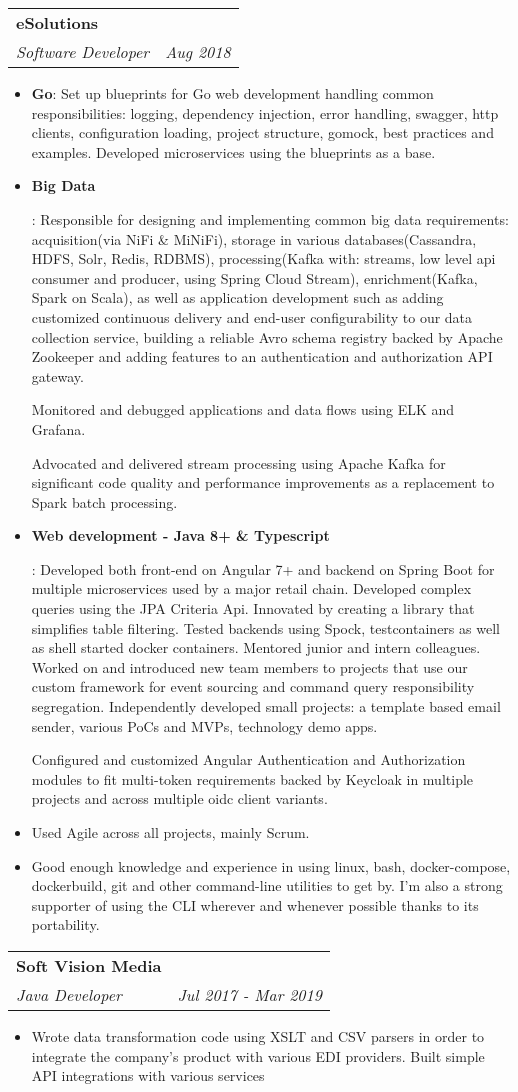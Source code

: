 \documentclass[letterpaper,11pt]{article}
\makeatletter
\newcommand{\resumeItem}[2]{
  \item\small{
    \textbf{#1}{: #2 \vspace{-2pt}}
  }
}
\newcommand{\simpleResumeItem}[1]{
  \item\small{
  #1
  }
}
\newcommand{\resumeSubheading}[4]{
  \vspace{-1pt}\item
    \begin{tabular*}{0.97\textwidth}[t]{l@{\extracolsep{\fill}}r}
      \textbf{#1} & #2 \\
      \textit{\small#3} & \textit{\small #4} \\
    \end{tabular*}\vspace{-5pt}
}
\newcommand{\resumeItemListStart}{\begin{itemize}}
\newcommand{\resumeItemListEnd}{\end{itemize}\vspace{-5pt}}
\makeatother
\begin{document}
    \resumeSubheading
      {eSolutions}{}
      {Software Developer}{Aug 2018}
      \resumeItemListStart
	\resumeItem{Go}{
	  Set up blueprints for Go web development handling common responsibilities: logging, dependency injection, error handling, swagger, http clients, configuration loading, project structure, gomock, best practices and examples. Developed microservices using the blueprints as a base.
	}
        \resumeItem{Big Data}{
          Responsible for designing and implementing common big data requirements: acquisition(via NiFi \& MiNiFi), storage in various databases(Cassandra, HDFS, Solr, Redis, RDBMS), processing(Kafka with: streams, low level api consumer and producer, using Spring Cloud Stream), enrichment(Kafka, Spark on Scala), as well as application development such as adding customized continuous delivery and end-user configurability to our data collection service, building a reliable Avro schema registry backed by Apache Zookeeper and adding features to an authentication and authorization API gateway.
          
          Monitored and debugged applications and data flows using ELK and Grafana.
          
          Advocated and delivered stream processing using Apache Kafka for significant code quality and performance improvements as a replacement to Spark batch processing.}
        \resumeItem{Web development - Java 8+ & Typescript}{
	  Developed both front-end on Angular 7+ and backend on Spring Boot for multiple microservices used by a major retail chain. Developed complex queries using the JPA Criteria Api. Innovated by creating a library that simplifies table filtering. Tested backends using Spock, testcontainers as well as shell started docker containers. Mentored junior and intern colleagues. Worked on and introduced new team members to projects that use our custom framework for event sourcing and command query responsibility segregation. Independently developed small projects: a template based email sender, various PoCs and MVPs, technology demo apps.

	  Configured and customized Angular Authentication and Authorization modules to fit multi-token requirements backed by Keycloak in multiple projects and across multiple oidc client variants.
}

       	\simpleResumeItem{}{
	Used Agile across all projects, mainly Scrum.
	}
	\simpleResumeItem{}{
	Good enough knowledge and experience in using linux, bash, docker-compose, dockerbuild, git and other command-line utilities to get by. I'm also a strong supporter of using the CLI wherever and whenever possible thanks to its portability.  
	}
      \resumeItemListEnd
    \resumeSubheading
      {Soft Vision Media}{}
      {Java Developer}{Jul 2017 - Mar 2019}
      \resumeItemListStart
        \simpleResumeItem{
          Wrote data transformation code using XSLT and CSV parsers in order to integrate the company's product with various EDI providers. Built simple API integrations with various services}
      \resumeItemListEnd
\end{document}
